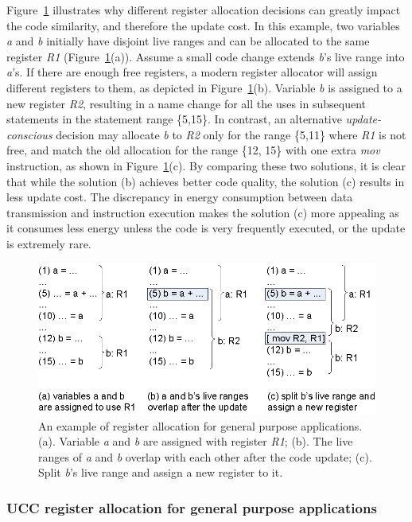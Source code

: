 Figure~\ref{freg0} illustrates why different register
allocation decisions can greatly impact the code similarity, and therefore the
update cost. In this example, two variables {\it a} and {\it b}
initially have disjoint live ranges and can be allocated to the same
register {\it R1} (Figure~\ref{freg0}(a)). Assume a small code change
extends {\it b}'s live range into {\it a}'s. If there are enough free
registers, a modern register allocator will assign different registers
to them, as depicted in Figure~\ref{freg0}(b).  Variable {\it b} is
assigned to a new register {\it R2}, resulting in a name change for
all the uses in subsequent statements in the statement range \{5,15\}.
In contrast, an alternative {\em update-conscious} decision may
allocate {\it b} to {\it R2} only for the range \{5,11\} where {\it
R1} is not free, and match the old allocation for the range \{12, 15\}
with one extra {\it mov} instruction, as shown in Figure~\ref{freg0}(c). By comparing these two solutions, it is clear 
that
while the solution (b) achieves better code quality, the solution (c)
results in less update cost. The discrepancy in energy consumption
between data transmission and instruction execution makes the solution
(c) more appealing as it consumes less energy unless the code is very
frequently executed, or the update is extremely rare.

\begin{figure}
\centering
\includegraphics[scale=1.2]{figures/freg.0.eps}
\caption[An example of register allocation for general purpose applications.]{An example of register allocation for 
general purpose applications.
(a). Variable {\it a} and {\it b} are assigned with register {\it R1};
(b). The live ranges of {\it a} and {\it b} overlap with each other after the code update;
(c). Split {\it b}'s live range and assign a new register to it.}
\label{freg0}
\end{figure}


\subsubsection{UCC register allocation for general purpose applications}\label{secra}
%


